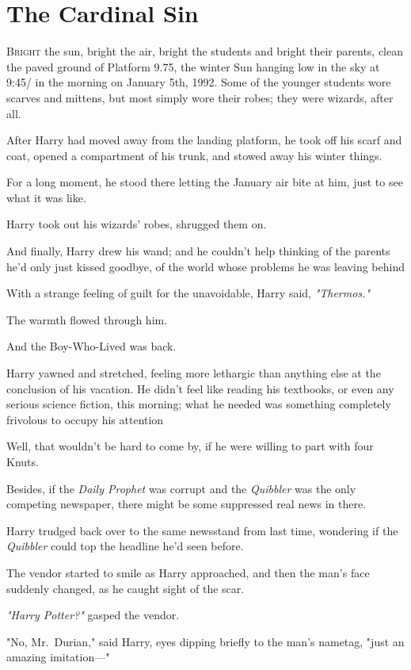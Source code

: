 \chapter{The Cardinal Sin}

\lettrine{B}{right} the sun,
bright the air, bright the students and bright their parents, clean the paved
ground of Platform 9.75, the winter Sun hanging low in the sky at 9:45\AM/ in the
morning on January 5th, 1992. Some of the younger students wore scarves and
mittens, but most simply wore their robes; they were wizards, after all.

After Harry had moved away from the landing platform, he took off his scarf and
coat, opened a compartment of his trunk, and stowed away his winter things.

For a long moment, he stood there letting the January air bite at him, just to
see what it was like.

Harry took out his wizards' robes, shrugged them on.

And finally, Harry drew his wand; and he couldn't help thinking of the parents
he'd only just kissed goodbye, of the world whose problems he was leaving
behind{\el}

With a strange feeling of guilt for the unavoidable, Harry said,
\emph{"Thermos."}

The warmth flowed through him.

And the Boy-Who-Lived was back.

Harry yawned and stretched, feeling more lethargic than anything else at the
conclusion of his vacation. He didn't feel like reading his textbooks, or even
any serious science fiction, this morning; what he needed was something
completely frivolous to occupy his attention{\el}

Well, that wouldn't be hard to come by, if he were willing to part with four
Knuts.

Besides, if the \emph{Daily Prophet} was corrupt and the \emph{Quibbler} was
the only competing newspaper, there might be some suppressed real news in there.

Harry trudged back over to the same newsstand from last time, wondering if the
\emph{Quibbler} could top the headline he'd seen before.

The vendor started to smile as Harry approached, and then the man's face
suddenly changed, as he caught sight of the scar.

\emph{"Harry Potter?"} gasped the vendor.

"No, Mr.~Durian," said Harry, eyes dipping briefly to the man's nametag, "just
an amazing imitation\mbox{---}"

